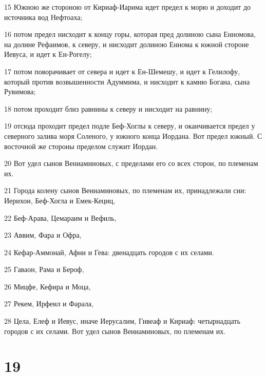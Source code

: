 \par 15 Южною же стороною от Кириаф-Иарима идет предел к морю и доходит до источника вод Нефтоаха;
\par 16 потом предел нисходит к концу горы, которая пред долиною сына Енномова, на долине Рефаимов, к северу, и нисходит долиною Еннома к южной стороне Иевуса, и идет к Ен-Рогелу;
\par 17 потом поворачивает от севера и идет к Ен-Шемешу, и идет к Гелилофу, который против возвышенности Адуммима, и нисходит к камню Богана, сына Рувимова;
\par 18 потом проходит близ равнины к северу и нисходит на равнину;
\par 19 отсюда проходит предел подле Беф-Хоглы к северу, и оканчивается предел у северного залива моря Соленого, у южного конца Иордана. Вот предел южный. С восточной же стороны пределом служит Иордан.
\par 20 Вот удел сынов Вениаминовых, с пределами его со всех сторон, по племенам их.
\par 21 Города колену сынов Вениаминовых, по племенам их, принадлежали сии: Иерихон, Беф-Хогла и Емек-Кециц,
\par 22 Беф-Арава, Цемараим и Вефиль,
\par 23 Аввим, Фара и Офра,
\par 24 Кефар-Аммонай, Афни и Гева: двенадцать городов с их селами.
\par 25 Гаваон, Рама и Бероф,
\par 26 Мицфе, Кефира и Моца,
\par 27 Рекем, Ирфеил и Фарала,
\par 28 Цела, Елеф и Иевус, иначе Иерусалим, Гивеаф и Кириаф: четырнадцать городов с их селами. Вот удел сынов Вениаминовых, по племенам их.

\chapter{19}

